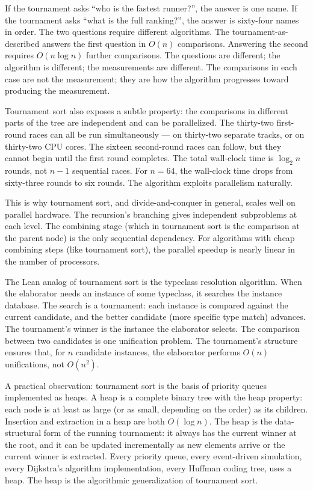 If the tournament asks ``who is the fastest runner?'', the answer is one
name. If the tournament asks ``what is the full ranking?'', the answer is
sixty-four names in order. The two questions require different
algorithms. The tournament-as-described answers the first question in
$O(n)$ comparisons. Answering the second requires $O(n \log n)$ further
comparisons. The questions are different; the algorithm is different; the
measurements are different. The comparisons in each case are not the
measurement; they are how the algorithm progresses toward producing the
measurement.

Tournament sort also exposes a subtle property: the comparisons in
different parts of the tree are independent and can be parallelized. The
thirty-two first-round races can all be run simultaneously --- on
thirty-two separate tracks, or on thirty-two CPU cores. The sixteen
second-round races can follow, but they cannot begin until the first
round completes. The total wall-clock time is $\log_2 n$ rounds, not $n -
1$ sequential races. For $n = 64$, the wall-clock time drops from
sixty-three rounds to six rounds. The algorithm exploits parallelism
naturally.

This is why tournament sort, and divide-and-conquer in general, scales
well on parallel hardware. The recursion's branching gives independent
subproblems at each level. The combining stage (which in tournament sort
is the comparison at the parent node) is the only sequential dependency.
For algorithms with cheap combining steps (like tournament sort), the
parallel speedup is nearly linear in the number of processors.

The Lean analog of tournament sort is the typeclass resolution algorithm.
When the elaborator needs an instance of some typeclass, it searches the
instance database. The search is a tournament: each instance is compared
against the current candidate, and the better candidate (more specific
type match) advances. The tournament's winner is the instance the
elaborator selects. The comparison between two candidates is one
unification problem. The tournament's structure ensures that, for $n$
candidate instances, the elaborator performs $O(n)$ unifications, not
$O(n^2)$.

A practical observation: tournament sort is the basis of priority queues
implemented as heaps. A heap is a complete binary tree with the heap
property: each node is at least as large (or as small, depending on the
order) as its children. Insertion and extraction in a heap are both
$O(\log n)$. The heap is the data-structural form of the running
tournament: it always has the current winner at the root, and it can be
updated incrementally as new elements arrive or the current winner is
extracted. Every priority queue, every event-driven simulation, every
Dijkstra's algorithm implementation, every Huffman coding tree, uses a
heap. The heap is the algorithmic generalization of tournament sort.

